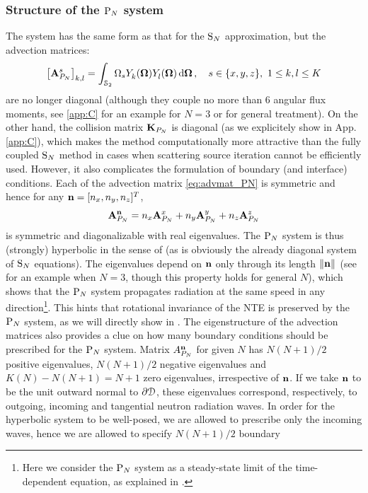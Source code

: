 \subsubsection{Structure of the $\text{P}_{N}$ system}
The system has the same form as that for the $\text{S}_{N}$ approximation, but the advection matrices:
\begin{equation}\label{eq:advmat_PN}
	\left[\mat{A}_{P_N}^s\right]_{k,l} = \intA{\Omega_s \Y{k}{}(\bomega)\Yc{l}{}(\bomega)},\quad s\in\{x,y,z\},\ 
	1 \leq k,l \leq  K
\end{equation}
are no longer diagonal (although they couple no more than 6 angular flux moments, see \ref{app:C} for an example for $N
= 3$ or \cite[App. A]{Sanchez8} for general treatment). On the other hand, the collision matrix $\mathbf{K}_{P_N}$ is
diagonal (as we explicitely show in App. \ref{app:C}), which makes the method computationally more attractive than the 
fully coupled $\text{S}_{N}$ method in cases when scattering source iteration cannot be efficiently used. However, it also
complicates the formulation of boundary (and interface) conditions. Each of the advection matrix \eqref{eq:advmat_PN} 
is symmetric and hence for any $\mathbf{n} = [n_x,n_y,n_z]^T$, 
$$
	\mathbf{A}_{P_N}^{\mathbf{n}} = n_x \mathbf{A}_{P_N}^x + n_y \mathbf{A}_{P_N}^y + n_z \mathbf{A}_{P_N}^z
$$
is symmetric and diagonalizable with real eigenvalues. The $\text{P}_{N}$ system is thus (strongly) hyperbolic in the sense of 
\cite[Def. 18.1]{leveque} (as is obviously the already diagonal system of $\text{S}_{N}$ equations). The eigenvalues depend on 
$\mathbf{n}$ only through its length $\lVert \mathbf{n} \rVert_{}$ (see \sref{sec:app-adv} for an example when $N = 3$,  though this property
holds for general $N$), which shows that the $\text{P}_{N}$ system propagates radiation at the same speed in any
direction\footnote{Here we consider the $\text{P}_{N}$ system as a steady-state limit of the time-dependent equation, as
explained in \sref{sec:app-adv}.}.
This hints that rotational invariance of the NTE is preserved by the $\text{P}_{N}$ system, as we will directly show in 
\sref{sec:dirinvPN}. The eigenstructure of the advection matrices also provides a clue on how many boundary conditions
should be prescribed for the $\text{P}_{N}$ system. Matrix $A_{P_N}^{\mathbf{n}}$ for given $N$ has
$N(N+1)/2$ positive eigenvalues, $N(N+1)/2$ negative eigenvalues and $K(N) - N(N+1) = N+1$ zero eigenvalues,
irrespective of $\mathbf{n}$. If we take $\mathbf{n}$ to be the unit outward normal to $\partial \mathcal{D}$, these eigenvalues correspond,
respectively, to outgoing, incoming and tangential neutron radiation waves. In order for the hyperbolic system to be
well-posed, we are allowed to prescribe only the incoming waves, hence we are allowed to specify $N(N+1)/2$ boundary
